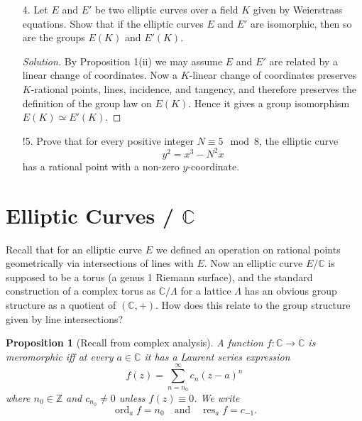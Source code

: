 \documentclass[a4paper]{article}
\newtheorem{proposition}[theorem]{Proposition}
\theoremstyle{definition}
\DeclareMathOperator{\ord}{ord}
\DeclareMathOperator{\res}{res}
\renewcommand{\O}{\mathcal{O}}
\newcommand{\F}{\mathbb{F}}
\newcommand{\Z}{\mathbb{Z}}
\newcommand{\C}{\mathbb{C}}
\begin{document}
\begin{enumerate}
\begin{proof}[Solution]
            For $E:y^2=x^3+x$ the points (apart from $\O$) are
            $\{(0,0),(2,1),(2,2)\}$. Since $(2,1)$ and $(2,2)$ do not have order
            2, having $y\ne0$, we have $E(\F_3)\simeq C_4$.
        \end{proof}

    \item[4.] Let $E$ and $E'$ be two elliptic curves over a field $K$ given by
        Weierstrass equations. Show that if the elliptic curves $E$ and $E'$ are
        isomorphic, then so are the groups $E(K)$ and $E'(K)$.

        \begin{proof}[Solution]
            By Proposition 1(ii) we may assume $E$ and $E'$ are related by a
            linear change of coordinates. Now a $K$-linear change of coordinates
            preserves $K$-rational points, lines, incidence, and tangency, and
            therefore preserves the definition of the group law on $E(K)$. Hence
            it gives a group isomorphism $E(K)\simeq E'(K)$.
        \end{proof}

    \item[!5.] Prove that for every positive integer $N\equiv5\mod8$, the
        elliptic curve
        \begin{equation*}
            y^2 = x^3-N^2x
        \end{equation*}
        has a rational point with a non-zero $y$-coordinate.
\end{enumerate}

\section{Elliptic Curves / $\C$}

Recall that for an elliptic curve $E$ we defined an operation on rational points
geometrically via intersections of lines with $E$. Now an elliptic curve $E/\C$
is supposed to be a torus (a genus 1 Riemann surface), and the standard
construction of a complex torus as $\C/\Lambda$ for a lattice $\Lambda$ has an
obvious group structure as a quotient of $(\C,+)$. How does this relate to the
group structure given by line intersections?

\begin{proposition}[Recall from complex analysis]
    A function $f:\C\to\C$ is meromorphic iff at
    every $a\in\C$ it has a Laurent series expression
    \begin{equation*}
        f(z) = \sum_{n=n_0}^\infty c_n(z-a)^n
    \end{equation*}
    where $n_0\in\Z$ and $c_{n_0}\ne0$ unless $f(z)\equiv0$. We write
    \begin{equation*}
        \ord_af = n_0 \quad \text{and} \quad \res_af=c_{-1}.
    \end{equation*}
\end{proposition}
\end{document}
